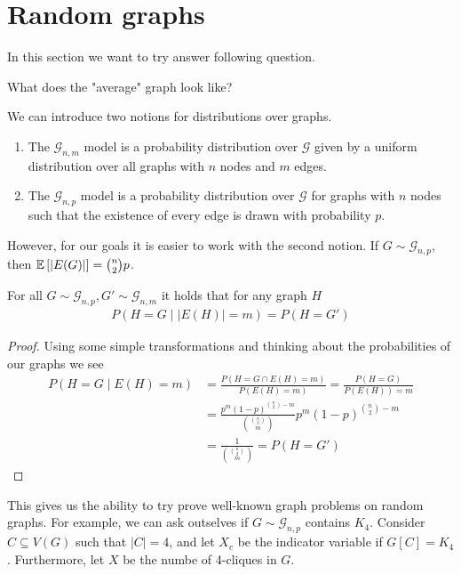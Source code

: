 \section{Random graphs}
In this section we want to try answer following question.
\begin{question}
    What does the "average" graph look like?
\end{question}
We can introduce two notions for distributions over graphs.
\begin{definition}
    \begin{enumerate}
        \item The $\mathcal{G}_{n,m}$ model is a probability distribution over $\mathcal{G}$
              given by a uniform distribution over all graphs with $n$ nodes and $m$ edges.
        \item The $\mathcal{G}_{n,p}$ model is a probability distribution over $\mathcal{G}$
              for graphs with $n$ nodes such that the existence of every edge is drawn with probability $p$.
    \end{enumerate}
\end{definition}
However, for our goals it is easier to work with the second notion.
If $G \sim \mathcal G_{n,p}$, then $\mathbb{E}\left[|E(G)|\right] = \binom{n}{2}p$.

\begin{lemma}
    For all $G \sim \mathcal G_{n,p}, G' \sim \mathcal G_{n,m}$ it holds that
    for any graph $H$
    \begin{align}
        P(H = G \mid |E(H)| = m) = P(H = G')
    \end{align}
\end{lemma}
\begin{proof}
    Using some simple transformations and thinking about the probabilities of our graphs we see
    \begin{align*}
        P(H = G \mid E(H) = m) & = \frac{P(H =G \cap E(H) = m)}{P(E(H) = m)} = \frac{P(H=G)}{P(E(H)) = m}             \\
                               & = \frac{p^m(1-p)^{\binom{n}{2}-m}}{\binom{\binom{n}{2}}{m}}p^m(1-p)^{\binom{n}{2}-m} \\
                               & = \frac{1}{\binom{\binom{n}{2}}{m}} = P(H = G')
    \end{align*}
\end{proof}
This gives us the ability to try prove well-known graph problems on random graphs.
For example, we can ask outselves if $G \sim \mathcal{G}_{n,p}$ contains $K_4$.
Consider $C \subseteq V(G)$ such that $|C| = 4$, and let $X_c$ be the indicator variable if $G[C] = K_4$.
Furthermore, let $X$ be the numbe of 4-cliques in $G$.

